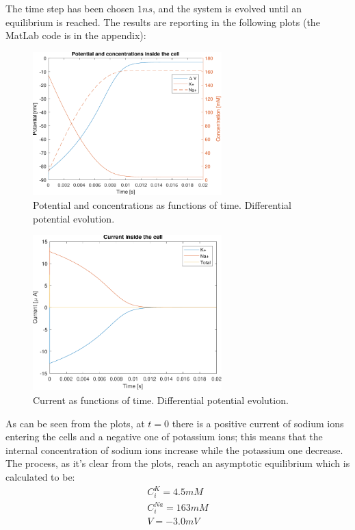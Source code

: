 \documentclass[11pt,a4 paper]{article}
\begin{document}
The time step has been chosen $1\si{ns}$, and the system is evolved until an equilibrium is reached. The results are reporting in the following plots (the MatLab code is in the appendix):

\begin{figure}[H]
    \centering
    \includegraphics[width=0.65\textwidth]{potential_diffpot.pdf}
    \caption{Potential and concentrations as functions of time. Differential potential evolution.}
    \label{fig:potential_diffpot}
\end{figure}

\begin{figure}[H]
    \centering
    \includegraphics[width=0.65\textwidth]{current_diffpot.pdf}
    \caption{Current as functions of time. Differential potential evolution.}
    \label{fig:current_diffpot}
\end{figure}

As can be seen from the plots, at $t=0$ there is a positive current of sodium ions entering the cells and a negative one of potassium ions; this means that the internal concentration of sodium ions increase while the potassium one decrease. The process, as it's clear from the plots, reach an asymptotic equilibrium which is calculated to be:
\begin{gather*}
    C_i^K = 4.5 \si{mM}\\
    C_i^{Na} = 163 \si{mM}\\
    V = -3.0 \si{mV}
\end{gather*}
\end{document}
